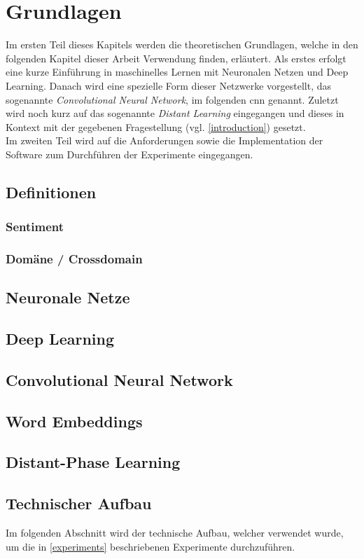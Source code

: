 \chapter{Grundlagen}
Im ersten Teil dieses Kapitels werden die theoretischen Grundlagen, welche in den folgenden Kapitel dieser Arbeit Verwendung finden, erläutert. Als erstes erfolgt eine kurze Einführung in maschinelles Lernen mit Neuronalen Netzen und Deep Learning. Danach wird eine spezielle Form dieser Netzwerke vorgestellt, das sogenannte \emph{Convolutional Neural Network}, im folgenden \gls{cnn} genannt. Zuletzt wird noch kurz auf das sogenannte \emph{Distant Learning} \cite{deriu2016sentiment} eingegangen und dieses in Kontext mit der gegebenen Fragestellung (vgl. \ref{introduction}) gesetzt.\\
Im zweiten Teil wird auf die Anforderungen sowie die Implementation der Software zum Durchführen der Experimente eingegangen.

\section{Definitionen}
\subsection{Sentiment}
\blindtext
\subsection{Domäne / Crossdomain}
\blindtext
\section{Neuronale Netze}
\blindtext
\section{Deep Learning}
\blindtext
\section{Convolutional Neural Network}
\blindtext
\section{Word Embeddings}
\blindtext
\section{Distant-Phase Learning}
\blindtext
\section{Technischer Aufbau}
Im folgenden Abschnitt wird der technische Aufbau, welcher verwendet wurde, um die in \ref{experiments} beschriebenen Experimente durchzuführen.

